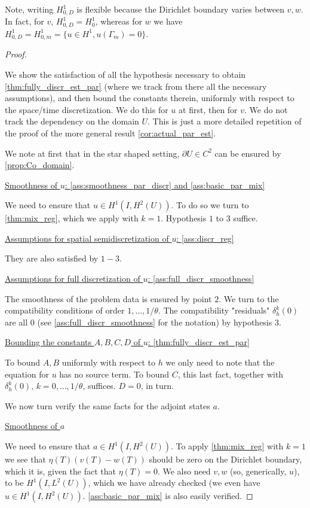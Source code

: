 \documentclass[english,a4paper,9pt,oneside]{scrbook}	%
\theoremstyle{break}
\newenvironment{mproof}[1][\proofname]{%
  \begin{proof}[#1]$ $\par\nobreak\ignorespaces
}{%
  \end{proof}
}
\renewcommand*{\proofname}{Proof}
\theoremstyle{remark}
\begin{document}
Note, writing $H^1_{0,D}$ is flexible because the Dirichlet boundary varies between $v,w$. In fact, for $v$, $H^1_{0,D}=H^1_0$, whereas for $w$ we have $H^1_{0,D}=H^1_{0,m}=\{u \in H^1, u(\Gamma_m)=0\}$.

\begin{mproof}

We show the satisfaction of all the hypothesis necessary to obtain \cref{thm:fully_discr_est_par} (where we track from there all the necessary assumptions), and then bound the constants therein, uniformly with respect to the space/time discretization. We do this for $u$ at first, then for $v$. We do not track the dependency on the domain $U$. This is just a more detailed repetition of the proof of the more general result \cref{cor:actual_par_est}.

We note at first that in the star shaped setting, $\partial U \in C^2$ can be ensured by \cref{prop:Co_domain}.

\underline{Smoothness of $u$: \cref{ass:smoothness_par_discr} and  \cref{ass:basic_par_mix}}

We need to ensure that $u \in H^1(I,H^2(U))$. To do so we turn to \cref{thm:mix_reg}, which we apply with $k=1$. Hypothesis $1$ to $3$ suffice. 

\underline{Assumptions for spatial semidiscretization of $u$: \cref{ass:discr_reg}}

They are also satisfied by $1-3$.

\underline{Assumptions for full discretization of $u$: \cref{ass:full_discr_smoothness}}

The smoothness of the problem data is ensured by point $2$. We turn to the compatibility conditions of order $1,...,1/\theta$. The compatibility "residuals" $\delta_h^k(0)$ are all $0$ (see \cref{ass:full_discr_smoothness} for the notation) by hypothesis $3$.

\underline{Bounding the constants $A,B,C,D$ of $u$: \cref{thm:fully_discr_est_par}}

To bound $A,B$ uniformly with respect to $h$ we only need to note that the equation for $u$ has no source term. To bound $C$, this last fact, together with $\delta_h^k(0)$, $k=0,...,1/\theta$, suffices. $D=0$, in turn.

We now turn verify the same facts for the adjoint states $a$.

\underline{Smoothness of $a$}

We need to ensure that $a \in H^1(I,H^2(U))$. To apply \cref{thm:mix_reg} with $k=1$ we see that $\eta(T)(v(T)-w(T))$ should be zero on the Dirichlet boundary, which it is, given the fact that $\eta(T)=0$. We also need $v,w$ (so, generically, $u$), to be $H^1(I, L^2(U))$, which we have already checked (we even have $u \in H^1(I,H^2(U))$.  \cref{ass:basic_par_mix} is also easily verified.


\end{mproof}
\end{document}
